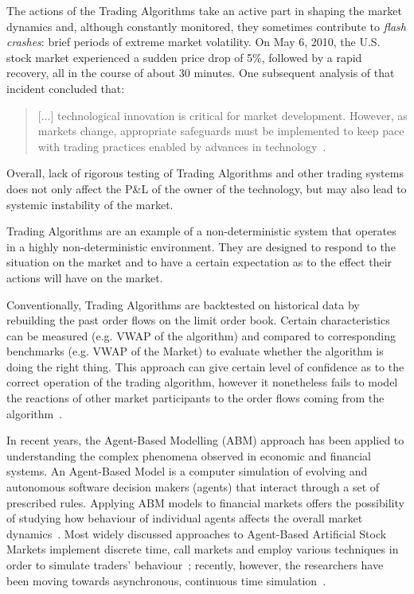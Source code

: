 The actions of the Trading Algorithms take an active part in shaping the market dynamics and, although constantly monitored, they sometimes contribute to \emph{flash crashes}: brief periods of extreme market volatility. On May 6, 2010, the U.S. stock market experienced a sudden price drop of 5\%, followed by a rapid recovery, all in the course of about 30 minutes. One subsequent analysis of that incident concluded that:
\begin{quote}
[$\ldots$] technological innovation is critical for market development. However, as markets change, appropriate safeguards must be implemented to keep pace with trading practices enabled by advances in technology~\cite{Kirilenko2011}.
\end{quote}
Overall, lack of rigorous testing of Trading Algorithms and other trading systems does not only affect the P\&L  of the owner of the technology, but may also lead to systemic instability of the market.

Trading Algorithms are an example of a non-deterministic system that operates in a highly non-deterministic environment. They are designed to respond to the situation on the market and to have a certain expectation as to the effect their actions will have on the market.

Conventionally, Trading Algorithms are backtested on historical data by rebuilding the past order flows on the limit order book. Certain characteristics can be measured (e.g. VWAP of the algorithm) and compared to corresponding benchmarks (e.g. VWAP of the Market) to evaluate whether the algorithm is doing the right thing. This approach can give certain level of confidence as to the correct operation of the trading algorithm, however it nonetheless fails to model the reactions of other market participants to the order flows coming from the algorithm~\cite{Coggins2006}.

In recent years, the Agent-Based Modelling (ABM) approach has been applied to understanding the complex phenomena observed in economic and financial systems. An Agent-Based Model is a computer simulation of evolving and autonomous software decision makers (agents) that interact through a set of prescribed rules. Applying ABM models to financial markets offers the possibility of studying how behaviour of individual agents affects the overall market dynamics~\citep{Sorban2008, Farmer2009}. Most widely discussed approaches to Agent-Based Artificial Stock Markets implement discrete time, call markets and employ various techniques in order to simulate traders' behaviour~\cite{Jha2010}; recently, however, the researchers have been moving towards asynchronous, continuous time simulation~\citep{Sorban2008,Gilles2006}.

